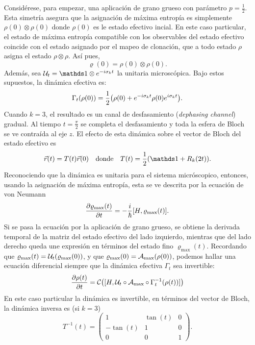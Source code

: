 Considérese, para empezar, una aplicación de grano grueso con parámetro $p=\frac{1}{2}$. Esta simetría asegura que la asignación de máxima entropía es simplemente $\rho(0)\otimes\rho(0)$ donde $\rho(0)$ es le estado efectivo incial. En este caso particular, el estado de máxima entropía compatible con los observables del estado efectivo coincide con el estado asignado por el mapeo de clonación, que a todo estado $\rho$ asigna el estado $\rho\otimes\rho$. Así pues,
\begin{equation*}
    \varrho(0)=\rho(0)\otimes\rho(0).
\end{equation*}
Además, sea $\mcU_{t}=\Id\otimes e^{-i\pauli{k}t}$ la unitaria microscópica. Bajo estos supuestos, la dinámica efectiva es:
\begin{equation*}
    \Gamma_{t}(\rho(0))=\frac{1}{2}\qty(\rho(0)+e^{-i\sigma_{k}t}\rho(0)e^{i\sigma_{k}t}).
\end{equation*}
Cuando $k=3$, el resultado es un canal de desfasamiento (\textit{dephasing channel}) gradual. Al tiempo $t=\frac{\pi}{2}$ se completa el desfasamiento y toda la esfera de Bloch se ve contraída al eje $z$. El efecto de esta dinámica sobre el vector de Bloch del estado efectivo es
\begin{align*}
    \vec{r}(t)=T(t)\vec{r}(0) & & \text{donde} & & T(t)=\frac{1}{2}(\Id+R_{k}(2t)).
\end{align*}
Reconociendo que la dinámica es unitaria para el sistema micróscopico, entonces, usando la asignación de máxima entropía, esta se ve descrita por la ecuación de von Neumann
\begin{equation*}
    \frac{\partial \varrho_{\max}(t)}{\partial t}=-\frac{i}{\hbar}\qty[H,\varrho_{\max}(t)].
\end{equation*}
Si se pasa la ecuación por la aplicación de grano grueso, se obtiene la derivada temporal de la matriz del estado efectivo del lado izquierdo, mientras que del lado derecho queda une expresión en términos del estado fino $\varrho_{\max}(t)$. Recordando que $\varrho_{\max}(t)=\mathcal{U}_{t}(\varrho_{\max}(0))$, y que $\varrho_{\max}(0)=\mathcal{A}_{\max}(\rho(0))$, podemos hallar una ecuación diferencial siempre que la dinámica efectiva $\Gamma_{t}$ sea invertible:
\begin{equation*}
    \frac{\partial \rho(t)}{\partial t}=\mathcal{C}\qty([H,\mathcal{U}_{t}\circ\mathcal{A}_{\max}\circ\Gamma_{t}^{-1}(\rho(t))])
\end{equation*}
En este caso particular la dinámica es invertible, en términos del vector de Bloch, la dinámica inversa es (si $k=3$)
\begin{equation*}
    T^{-1}(t)=\begin{pmatrix}
        1 & \tan(t) & 0 \\
        -\tan(t) & 1 & 0 \\
        0 & 0 & 1
     \end{pmatrix}.
\end{equation*}
